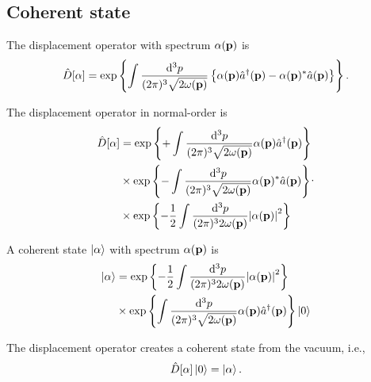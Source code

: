 \subsection{Coherent state}

\begin{definition}
	The displacement operator with spectrum $\alpha(\vb{p})$ is
	\begin{equation}
		\hat{D}[\alpha]
		=
		\exp\left\{
			\int\frac{\dd[3]{p}}{(2\pi)^3\sqrt{2\omega(\vb{p})}}
			\left\{
				\alpha(\vb{p})
				\hat{a}^\dagger(\vb{p})
				-
				\alpha(\vb{p})^*
				\hat{a}(\vb{p})
			\right\}
		\right\}
		\label{eq:displacement_operator}
		.
	\end{equation}
\end{definition}
\begin{lemma}\label{thm:displacement_operator_normal_ordered}
	The displacement operator in normal-order is
	\begin{equation}
		\begin{split}
			\hat{D}[\alpha]
			&=
			\exp\left\{
				+
				\int\frac{\dd[3]{p}}{(2\pi)^3\sqrt{2\omega(\vb{p})}}
				\alpha(\vb{p})
				\hat{a}^\dagger(\vb{p})
			\right\}
			\\
			&\times
			\exp\left\{
				-
				\int\frac{\dd[3]{p}}{(2\pi)^3\sqrt{2\omega(\vb{p})}}
				\alpha(\vb{p})^*
				\hat{a}(\vb{p})
			\right\}
			\\
			&\times
			\exp\left\{
				-
				\frac{1}{2}
				\int\frac{\dd[3]{p}}{(2\pi)^32\omega(\vb{p})}
				\abs{\alpha(\vb{p})}^2
			\right\}
		\end{split}
		\label{eq:displacement_operator_normal}
		.
	\end{equation}
\end{lemma}
\begin{definition}
	A coherent state $\ket{\alpha}$ with spectrum $\alpha(\vb{p})$ is
	\begin{equation}
		\begin{split}
			\ket{\alpha}
			&=
			\exp\left\{
				-
				\frac{1}{2}
				\int\frac{\dd[3]{p}}{(2\pi)^32\omega(\vb{p})}
				\abs{\alpha(\vb{p})}^2
			\right\}
			\\
			&\times
			\exp\left\{
				\int\frac{\dd[3]{p}}{(2\pi)^3\sqrt{2\omega(\vb{p})}}
				\alpha(\vb{p})
				\hat{a}^\dagger(\vb{p})
			\right\}
			\ket{0}
		\end{split}
	\end{equation}
\end{definition}
\begin{lemma}
	The displacement operator creates a coherent state from the vacuum, i.e.,
	\begin{equation}
		\hat{D}[\alpha]
		\ket{0}
		=
		\ket{\alpha}
		.
	\end{equation}
\end{lemma}
